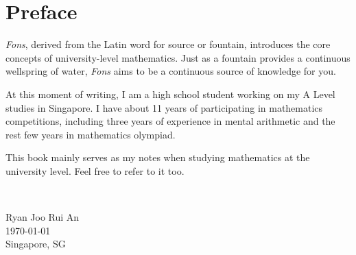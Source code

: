 \chapter*{Preface}
\emph{Fons}, derived from the Latin word for source or fountain, introduces the core concepts of university-level mathematics. Just as a fountain provides a continuous wellspring of water, \emph{Fons} aims to be a continuous source of knowledge for you.

At this moment of writing, I am a high school student working on my A Level studies in Singapore. I have about 11 years of participating in mathematics competitions, including three years of experience in mental arithmetic and the rest few years in mathematics olympiad.

This book mainly serves as my notes when studying mathematics at the university level. Feel free to refer to it too.

\

\begin{flushright}
Ryan Joo Rui An\\
\today\\
Singapore, SG
\end{flushright}